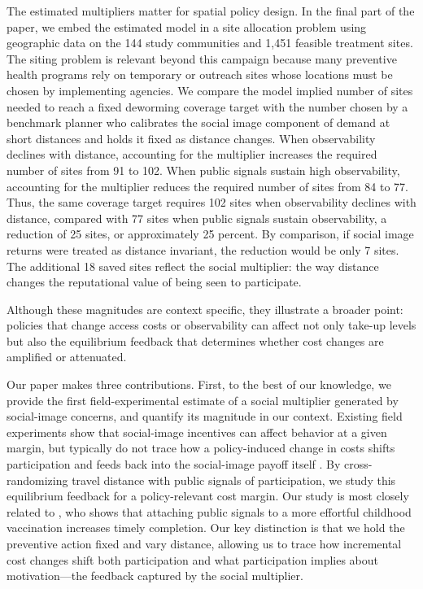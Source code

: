 \documentclass[12pt,a4paper]{article}
\begin{document}
The estimated multipliers matter for spatial policy design. In the final part of the paper, we embed the estimated model in a site allocation problem using geographic data on the 144 study communities and 1{,}451 feasible treatment sites. The siting problem is relevant beyond this campaign because many preventive health programs rely on temporary or outreach sites whose locations must be chosen by implementing agencies. We compare the model implied number of sites needed to reach a fixed deworming coverage target with the number chosen by a benchmark planner who calibrates the social image component of demand at short distances and holds it fixed as distance changes. When observability declines with distance, accounting for the multiplier increases the required number of sites from 91 to 102. When public signals sustain high observability, accounting for the multiplier reduces the required number of sites from 84 to 77. Thus, the same coverage target requires 102 sites when observability declines with distance, compared with 77 sites when public signals sustain observability, a reduction of 25 sites, or approximately 25 percent. By comparison, if social image returns were treated as distance invariant, the reduction would be only 7 sites. The additional 18 saved sites reflect the social multiplier: the way distance changes the reputational value of being seen to participate.

Although these magnitudes are context specific, they illustrate a broader point: policies that change access costs or observability can affect not only take-up levels but also the equilibrium feedback that determines whether cost changes are amplified or attenuated. 

Our paper makes three contributions. First, to the best of our knowledge, we provide the first field-experimental estimate of a social multiplier generated by social-image concerns, and quantify its magnitude in our context. Existing field experiments show that social-image incentives can affect behavior at a given margin, but typically do not trace how a policy-induced change in costs shifts participation and feeds back into the social-image payoff itself \citep{bursztyn_social_2017,bursztyn_status_2018,chandrasekhar_social_2018,dellavigna_voting_2017,karing,breza19}. By cross-randomizing travel distance with public signals of participation, we study this equilibrium feedback for a policy-relevant cost margin. Our study is most closely related to \citet{karing}, who shows that attaching public signals to a more effortful childhood vaccination increases timely completion. Our key distinction is that we hold the preventive action fixed and vary distance, allowing us to trace how incremental cost changes shift both participation and what participation implies about motivation---the feedback captured by the social multiplier.
\end{document}
